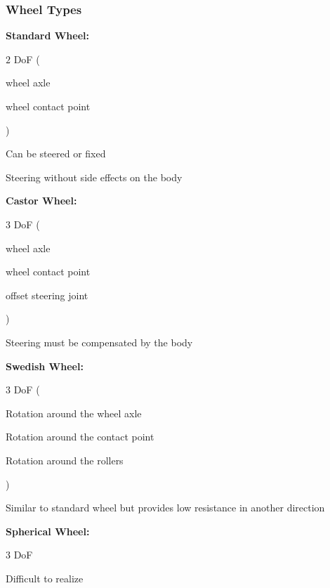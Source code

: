 \documentclass[a4paper]{article}
\newcommand{\icon}{\item[-]}
\newcommand{\ides}[1]{\item \textbf{#1}}
\begin{document}
\subsubsection{Wheel Types}
\begin{itemize}
    \ides{Standard Wheel:}
        \begin{itemize*}
            \item $2$ DoF
                (\begin{itemize*}
                    \item wheel axle
                    \item wheel contact point
                \end{itemize*})
            \item Can be steered or fixed
            \item Steering without side effects on the body
        \end{itemize*}
    \ides{Castor Wheel:}
        \begin{itemize*}
            \item $3$ DoF
                (\begin{itemize*}
                    \item wheel axle
                    \item wheel contact point
                    \item offset steering joint
                \end{itemize*})
            \item Steering must be compensated by the body
        \end{itemize*}
    \ides{Swedish Wheel:}
        \begin{itemize*}
            \item $3$ DoF
                (\begin{itemize*}
                    \item Rotation around the wheel axle
                    \item Rotation around the contact point
                    \item Rotation around the rollers
                \end{itemize*})
            \item Similar to standard wheel but provides low resistance in another direction
        \end{itemize*}
    \ides{Spherical Wheel:}
        \begin{itemize*}
            \item $3$ DoF
            \icon Difficult to realize
        \end{itemize*}
\end{itemize}
\end{document}
